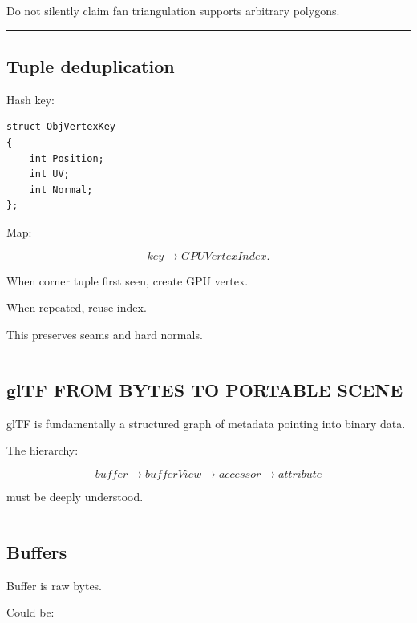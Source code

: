 Do not silently claim fan triangulation supports arbitrary polygons.

\begin{center}\rule{0.5\linewidth}{0.5pt}\end{center}

\subsection{Tuple deduplication}\label{04-visual-computing-ii-ch041-tuple-deduplication}

Hash key:

\begin{verbatim}
struct ObjVertexKey
{
    int Position;
    int UV;
    int Normal;
};
\end{verbatim}

Map:

\[
key\rightarrow GPUVertexIndex.
\]

When corner tuple first seen, create GPU vertex.

When repeated, reuse index.

This preserves seams and hard normals.

\begin{center}\rule{0.5\linewidth}{0.5pt}\end{center}

\subsection{glTF FROM BYTES TO PORTABLE SCENE}\label{04-visual-computing-ii-ch041-gltf-from-bytes-to-portable-scene}

glTF is fundamentally a structured graph of metadata pointing into binary data.

The hierarchy:

\[
\boxed{
buffer
\rightarrow
bufferView
\rightarrow
accessor
\rightarrow
attribute
}
\]

must be deeply understood.

\begin{center}\rule{0.5\linewidth}{0.5pt}\end{center}

\subsection{Buffers}\label{04-visual-computing-ii-ch041-buffers}

Buffer is raw bytes.

Could be:

